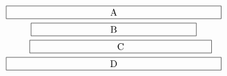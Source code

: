 \documentclass{article}
\begin{document}
\begin{multline}
\framebox[.65\columnwidth]{A}\\
\framebox[.5\columnwidth]{B}\\
\shoveright{\framebox[.55\columnwidth]{C}}\\
\framebox[.65\columnwidth]{D}
\end{multline}
\end{document}
